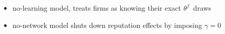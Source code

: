 \documentclass[notes=show]{beamer}
\begin{document}
\begin{frame}%




\begin{itemize}
\item {\small no-learning model, treats firms as knowing their exact }$%
\theta ^{f}${\small \ draws}

\item {\small no-network model shuts down reputation effects by imposing }$%
\gamma =0$
\end{itemize}

\end{frame}%
\end{document}

